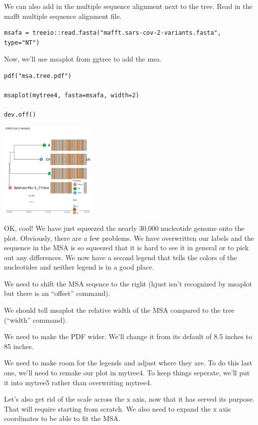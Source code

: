 \documentclass[
]{book}
\begin{document}
We can also add in the multiple sequence alignment next to the tree. Read in the mafft multiple sequence alignment file.

\begin{verbatim}
msafa = treeio::read.fasta("mafft.sars-cov-2-variants.fasta", type="NT")
\end{verbatim}

Now, we'll use msaplot from ggtree to add the msa.

\begin{verbatim}
pdf("msa.tree.pdf")

msaplot(mytree4, fasta=msafa, width=2)

dev.off()
\end{verbatim}

\includegraphics[width=0.35\textwidth,height=\textheight]{./Figures/msa.tree.png}

OK, cool! We have just squeezed the nearly 30,000 nucleotide genome onto the plot. Obviously, there are a few problems. We have overwritten our labels and the sequence in the MSA is so squeezed that it is hard to see it in general or to pick out any differences. We now have a second legend that tells the colors of the nucleotides and neither legend is in a good place.

We need to shift the MSA seqence to the right (hjust isn't recognized by msaplot but there is an ``offset'' command).

We should tell msaplot the relative width of the MSA compared to the tree (``width'' command).

We need to make the PDF wider. We'll change it from its default of 8.5 inches to 85 inches.

We need to make room for the legends and adjust where they are. To do this last one, we'll need to remake our plot in mytree4. To keep things seperate, we'll put it into mytree5 rather than overwriting mytree4.

Let's also get rid of the scale across the x axis, now that it has served its purpose. That will require starting from scratch. We also need to expand the x axis coordinates to be able to fit the MSA.
\end{document}
